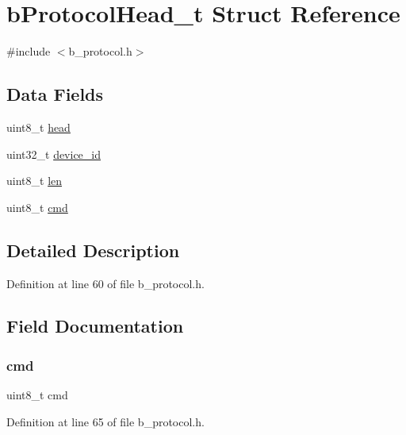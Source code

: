 \hypertarget{structb_protocol_head__t}{}\section{b\+Protocol\+Head\+\_\+t Struct Reference}
\label{structb_protocol_head__t}


{\ttfamily \#include $<$b\+\_\+protocol.\+h$>$}

\subsection*{Data Fields}
\begin{DoxyCompactItemize}
\item 
uint8\+\_\+t \mbox{\hyperlink{structb_protocol_head__t_a9794c0e61506b826b49b458708ae2489}{head}}
\item 
uint32\+\_\+t \mbox{\hyperlink{structb_protocol_head__t_a658c495cd1900eadce3b800e3ebdac7a}{device\+\_\+id}}
\item 
uint8\+\_\+t \mbox{\hyperlink{structb_protocol_head__t_a5723e60ffd628510c699eddbce90be23}{len}}
\item 
uint8\+\_\+t \mbox{\hyperlink{structb_protocol_head__t_a4d43e8212bdc9dbee866506f04effcea}{cmd}}
\end{DoxyCompactItemize}


\subsection{Detailed Description}


Definition at line 60 of file b\+\_\+protocol.\+h.



\subsection{Field Documentation}
\mbox{\label{structb_protocol_head__t_a4d43e8212bdc9dbee866506f04effcea}} 
\subsubsection{\texorpdfstring{cmd}{cmd}}
{\footnotesize\ttfamily uint8\+\_\+t cmd}



Definition at line 65 of file b\+\_\+protocol.\+h.


